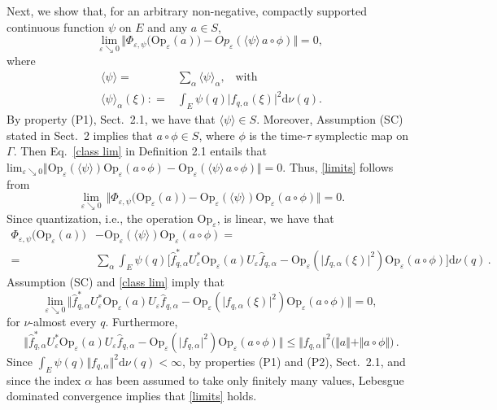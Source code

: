 \documentclass[12pt]{article}
\begin{document}
Next, we show that, for an arbitrary non-negative, compactly supported continuous function
$\psi$ on $E$ and any $a\in S$,
\begin{equation}\label{limits}
\underset{\varepsilon \searrow 0}{\text{lim}}\, \Vert \Phi_{\varepsilon, \psi}\big(\text{Op}_{\varepsilon}(a)\big) - 
Op_{\varepsilon}(\langle \psi\rangle\, a\circ \phi)\Vert = 0,
\end{equation}
where
\begin{align}
\langle \psi\rangle = &\sum_{\alpha} \langle \psi \rangle_{\alpha}, \,\,\,\text{ with }\nonumber \\
\langle \psi \rangle_{\alpha}(\xi) : =&\int_{E} \psi(q) \vert f_{q, \alpha}(\xi) \vert^{2} \text{d}\nu(q). \label{meanvalue}
\end{align}
By property (P1), Sect.~2.1, we have that $\langle \psi \rangle \in S$. Moreover, Assumption (SC) stated in Sect.~2 
implies that $a \circ \phi \in S$, where $\phi$ is the time-$\tau$ symplectic map on $\Gamma$. 
Then Eq.~\eqref{class lim} in Definition 2.1 entails that $\text{lim}_{\varepsilon \searrow 0} \Vert \text{Op}_{\varepsilon}
(\langle \psi \rangle) 
\text{Op}_{\varepsilon}(a\circ \phi) - \text{Op}_{\varepsilon}(\langle \psi \rangle\,a\circ \phi) \Vert =0. $ 
Thus, \eqref{limits} follows from
$$
\lim_{\varepsilon \searrow 0} \,\Vert \Phi_{\varepsilon, \psi}\big(\text{Op}_{\varepsilon}(a)\big) - \text{Op}_{\varepsilon}
(\langle \psi \rangle) \text{Op}_{\varepsilon}(a \circ \phi)\Vert =0.
$$
Since quantization, i.e., the operation $\text{Op}_{\varepsilon}$, is linear, we have that
\begin{align}
\Phi_{\varepsilon, \psi}\big(\text{Op}_{\varepsilon}(a)\big)& - \text{Op}_{\varepsilon} (\langle \psi \rangle) 
\text{Op}_{\varepsilon}(a \circ \phi) =\nonumber \\
= &\sum_{\alpha}\int_{E} \psi(q) \big[  \widehat{f}^{*}_{q, \alpha} U_{\varepsilon}^{*} 
\text{Op}_{\varepsilon}(a) U_{\varepsilon} \widehat{f}_{q, \alpha} - \text{Op}_{\varepsilon}( \vert f_{q,\alpha}(\xi)\vert^{2}) \text{Op}_{\varepsilon}(a \circ \phi)\big] \text{d}\nu(q)\,.\nonumber
\end{align}
Assumption (SC) and \eqref{class lim} imply that
$$\underset{\varepsilon \searrow 0}{\text{lim}}\, \Vert \widehat{f}^{*}_{q, \alpha} U_{\varepsilon}^{*} 
\text{Op}_{\varepsilon}(a) U_{\varepsilon} \widehat{f}_{q, \alpha} - \text{Op}_{\varepsilon}( \vert f_{q,\alpha}(\xi)\vert^{2}) \text{Op}_{\varepsilon}(a \circ \phi)\Vert =0,$$
for $\nu$-almost every $q$. Furthermore,
$$\Vert \widehat{f}^{*}_{q, \alpha} U_{\varepsilon}^{*} \text{Op}_{\varepsilon}(a) U_{\varepsilon} \widehat{f}_{q, \alpha} 
- \text{Op}_{\varepsilon}( \vert f_{q,\alpha}\vert^{2}) \text{Op}_{\varepsilon}(a \circ \phi)\Vert \leq 
\Vert f_{q,\alpha} \Vert^{2} \big( \Vert a\Vert + \Vert a\circ \phi \Vert\big)\,.$$
Since $\int_{E} \psi(q) \Vert f_{q,\alpha} \Vert^2 \text{d}\nu(q) < \infty$, by properties (P1) and (P2), Sect.~2.1, 
and since the index $\alpha$ has been assumed to take only finitely many values, Lebesgue dominated convergence 
implies that \eqref{limits} holds.
\end{document}
